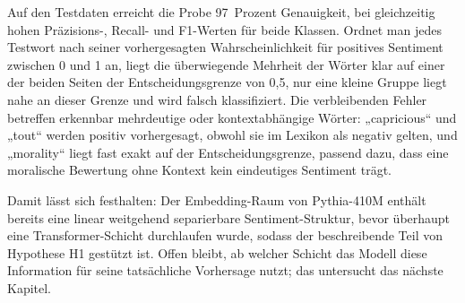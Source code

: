 Auf den Testdaten erreicht die Probe 97~Prozent Genauigkeit, bei gleichzeitig hohen Präzisions-, Recall- und F1-Werten für beide Klassen. Ordnet man jedes Testwort nach seiner vorhergesagten Wahrscheinlichkeit für positives Sentiment zwischen 0 und 1 an, liegt die überwiegende Mehrheit der Wörter klar auf einer der beiden Seiten der Entscheidungsgrenze von 0,5, nur eine kleine Gruppe liegt nahe an dieser Grenze und wird falsch klassifiziert. Die verbleibenden Fehler betreffen erkennbar mehrdeutige oder kontextabhängige Wörter: „capricious“ und „tout“ werden positiv vorhergesagt, obwohl sie im Lexikon als negativ gelten, und „morality“ liegt fast exakt auf der Entscheidungsgrenze, passend dazu, dass eine moralische Bewertung ohne Kontext kein eindeutiges Sentiment trägt.

Damit lässt sich festhalten: Der Embedding-Raum von Pythia-410M enthält bereits eine linear weitgehend separierbare Sentiment-Struktur, bevor überhaupt eine Transformer-Schicht durchlaufen wurde, sodass der beschreibende Teil von Hypothese H1 gestützt ist. Offen bleibt, ab welcher Schicht das Modell diese Information für seine tatsächliche Vorhersage nutzt; das untersucht das nächste Kapitel.
